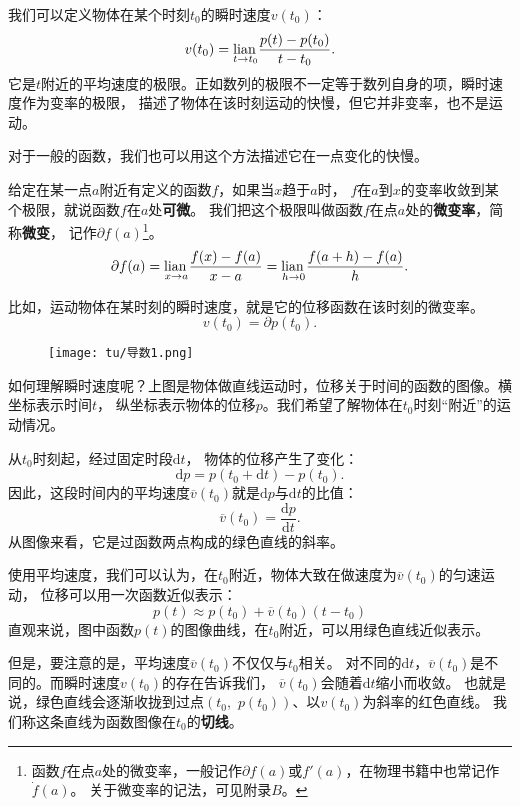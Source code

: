 \documentclass[12pt,UTF8]{ctexbook}
\begin{document}
我们可以定义物体在某个时刻$t_0$的瞬时速度$v(t_0)$：
$$ v(t_0) = \underset{t\to t_0}{\operatorname{lian}\,} \frac{p(t) - p(t_0)}{t - t_0}.$$
它是$t$附近的平均速度的极限。正如数列的极限不一定等于数列自身的项，瞬时速度作为变率的极限，
描述了物体在该时刻运动的快慢，但它并非变率，也不是运动。

对于一般的函数，我们也可以用这个方法描述它在一点变化的快慢。

\begin{df}\label{df:2-1-0}
    给定在某一点$a$附近有定义的函数$f$，如果当$x$趋于$a$时，
    $f$在$a$到$x$的变率收敛到某个极限，就说函数$f$在$a$处\textbf{可微}。
    我们把这个极限叫做函数$f$在点$a$处的\textbf{微变率}，简称\textbf{微变}，
    记作$\partial f(a)$\footnote{函数$f$在点$a$处的微变率，一般记作$\partial f(a)$或$f'(a)$，在物理书籍中也常记作$\dot{f}(a)$。
    关于微变率的记法，可见附录$B$。}。
    $$ \partial f(a) = \underset{x\to a}{\operatorname{lian}\,} \frac{f(x) - f(a)}{x - a} = \underset{h\to 0}{\operatorname{lian}\,} \frac{f(a + h) - f(a)}{h}.$$
\end{df}

比如，运动物体在某时刻的瞬时速度，就是它的位移函数在该时刻的微变率。
$$ v(t_0) = \partial p(t_0).$$

\begin{figure}[h]
    \vspace{4pt}
    \centering
    \texttt{[image: tu/导数1.png]}
\end{figure}

如何理解瞬时速度呢？上图是物体做直线运动时，位移关于时间的函数的图像。横坐标表示时间$t$，
纵坐标表示物体的位移$p$。我们希望了解物体在$t_0$时刻“附近”的运动情况。

从$t_0$时刻起，经过固定时段$\mathrm{d}t$，
物体的位移产生了变化：
$$\mathrm{d}p = p(t_0 + \mathrm{d}t) - p(t_0).$$
因此，这段时间内的平均速度$\overline{v}(t_0)$就是$\mathrm{d}p$与$\mathrm{d}t$的比值：
$$\overline{v}(t_0) = \frac{\mathrm{d}p}{\mathrm{d}t}.$$
从图像来看，它是过函数两点构成的绿色直线的斜率。

使用平均速度，我们可以认为，在$t_0$附近，物体大致在做速度为$\overline{v}(t_0)$的匀速运动，
位移可以用一次函数近似表示：
$$ p(t) \approx p(t_0) + \overline{v}(t_0)(t - t_0)$$
直观来说，图中函数$p(t)$的图像曲线，在$t_0$附近，可以用绿色直线近似表示。

但是，要注意的是，平均速度$\overline{v}(t_0)$不仅仅与$t_0$相关。
对不同的$\mathrm{d}t$，$\overline{v}(t_0)$是不同的。而瞬时速度$v(t_0)$的存在告诉我们，
$\overline{v}(t_0)$会随着$\mathrm{d}t$缩小而收敛。
也就是说，绿色直线会逐渐收拢到过点$(t_0, \,\,p(t_0))$、以$v(t_0)$为斜率的红色直线。
我们称这条直线为函数图像在$t_0$的\textbf{切线}。
\end{document}
